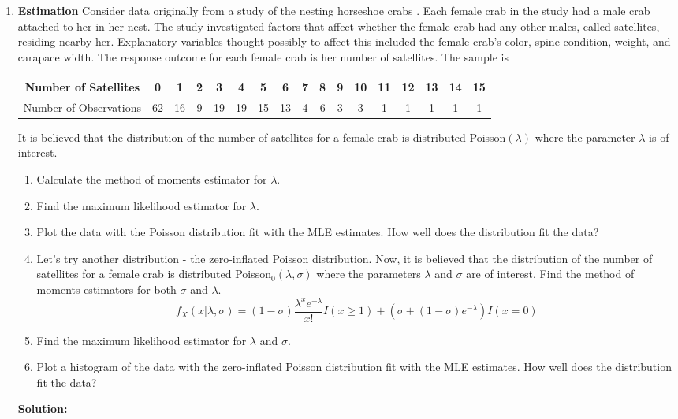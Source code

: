 \documentclass{article}
\begin{document}
\begin{enumerate}
\newpage
\item \textbf{Estimation} Consider  data originally from a study of the nesting horseshoe crabs \citep{brockmann1996satellite}. Each female crab in the study had a male crab attached to her in her nest. The study investigated factors that affect whether the female crab had any other males, called satellites, residing nearby her. Explanatory variables thought possibly to affect this included the female crab's color, spine condition, weight, and carapace width. The response outcome for each female crab is her number of satellites.
	 The sample is
	\begin{center}
		\begin{tabular}{|ccccccccccccccccc|}\hline
		 Number of Satellites& 0 & 1&  2&  3&  4&  5&  6&  7&  8&  9& 10& 11& 12& 13 &14& 15\\ \hline
		 Number of Observations&62& 16&  9& 19& 19& 15& 13&  4&  6&  3&  3&  1&  1&  1&  1&1\\\hline
 		\end{tabular}
	\end{center}
 	It is believed that the distribution of the number of satellites for a female crab is distributed Poisson$(\lambda)$ where the parameter $\lambda$ is of interest.
	\begin{enumerate}
	\item Calculate the method of moments estimator for $\lambda$.
	\item Find the maximum likelihood estimator for $\lambda$.
	\item Plot the data with the Poisson distribution fit with the MLE estimates. 
	How well does the distribution fit the data?
	\item Let's try another distribution - the zero-inflated Poisson distribution. Now, 
	it is believed that the distribution of the number of satellites for a female crab is
	distributed Poisson$_0(\lambda,\sigma)$ where the parameters $\lambda$ and $\sigma$ 
	are of interest. Find the method of moments estimators for both $\sigma$ and $\lambda$.
	 \[f_X(x|\lambda,\sigma)=(1-\sigma)\frac{\lambda^x e^{-\lambda}}{x!}I(x\geq1) + (\sigma+(1-\sigma)e^{-\lambda}) I(x=0)\]
	 \item Find the maximum likelihood estimator for $\lambda$ and $\sigma$.
	\item Plot a histogram of the data with the zero-inflated Poisson distribution fit with the MLE estimates. How well does the distribution fit the data?
	\end{enumerate}
\textbf{Solution:}

\end{enumerate}
\end{document}
